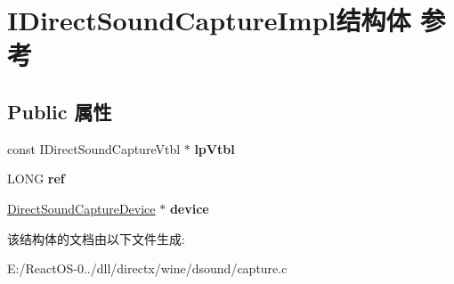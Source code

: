 \hypertarget{struct_i_direct_sound_capture_impl}{}\section{I\+Direct\+Sound\+Capture\+Impl结构体 参考}
\label{struct_i_direct_sound_capture_impl}
\subsection*{Public 属性}
\begin{DoxyCompactItemize}
\item 
\mbox{\label{struct_i_direct_sound_capture_impl_a0af5173865a490229b97a44571ecb150}} 
const I\+Direct\+Sound\+Capture\+Vtbl $\ast$ {\bfseries lp\+Vtbl}
\item 
\mbox{\label{struct_i_direct_sound_capture_impl_a26fff23f3d08c1d3dd93080c9dce4538}} 
L\+O\+NG {\bfseries ref}
\item 
\mbox{\label{struct_i_direct_sound_capture_impl_a238ed5e29dd804663c1e311a04e66449}} 
\hyperlink{struct_direct_sound_capture_device}{Direct\+Sound\+Capture\+Device} $\ast$ {\bfseries device}
\end{DoxyCompactItemize}


该结构体的文档由以下文件生成\+:\begin{DoxyCompactItemize}
\item 
E\+:/\+React\+O\+S-\/0../dll/directx/wine/dsound/capture.\+c\end{DoxyCompactItemize}
